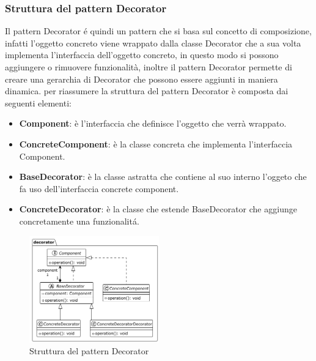 \documentclass[11pt]{article}
\begin{document}
\subsubsection{Struttura del pattern Decorator}
Il pattern Decorator é quindi un pattern che si basa sul concetto di composizione, infatti l'oggetto concreto viene wrappato dalla
classe Decorator che a sua volta implementa l'interfaccia dell'oggetto concreto, in questo modo si possono aggiungere o rimuovere funzionalità,
inoltre il pattern Decorator permette di creare una gerarchia di Decorator che possono essere aggiunti in maniera dinamica.
per riassumere la struttura del pattern Decorator è composta dai seguenti elementi:
\begin{itemize}
    \item \textbf{Component}: è l'interfaccia che definisce l'oggetto che verrà wrappato.
    \item \textbf{ConcreteComponent}: è la classe concreta che implementa l'interfaccia Component.
    \item \textbf{BaseDecorator}: è la classe astratta che contiene al suo interno l'oggeto che fa uso dell'interfaccia concrete component.
    \item \textbf{ConcreteDecorator}: è la classe che estende BaseDecorator che aggiunge concretamente una funzionalitá.
\end{itemize}
\begin{figure}[h]
    \centering
    \includegraphics[width=0.5\textwidth]{decoratorUML}
    \caption{Struttura del pattern Decorator}
\end{figure}
\end{document}
